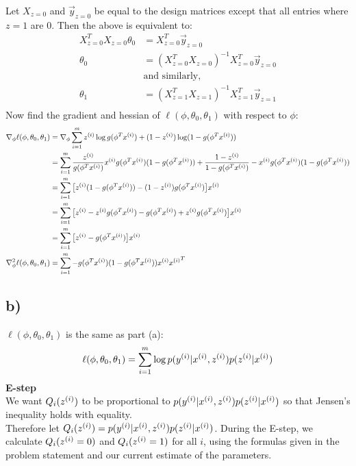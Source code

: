 \documentclass[11pt]{article}
\begin{document}
Let $X_{z = 0}$ and $\vec{y}_{z=0}$ be equal to the design matrices except that all entries where $z = 1$ are $0$. Then the above is equivalent to:
\begin{align*}
    X_{z=0}^T X_{z=0} \theta_0 &= X_{z=0}^T \vec{y}_{z=0} \\
                      \theta_0 &= (X_{z=0}^T X_{z=0})^{-1} X_{z=0}^T \vec{y}_{z=0} \\
                      &\text{and similarly,} \\
                      \theta_1 &= (X_{z=1}^T X_{z=1})^{-1} X_{z=1}^T \vec{y}_{z=1} \\
\end{align*}
Now find the gradient and hessian of $\ell(\phi,\theta_0,\theta_1)$ with respect to $\phi$:
\begin{align*}
    \nabla_\phi \ell(\phi,\theta_0,\theta_1) &= \nabla_\phi \sum_{i=1}^m z^{(i)} \log g(\phi^T x^{(i)}) + (1 - z^{(i)}) \log (1 - g(\phi^T x^{(i)})) \\
                                             &= \sum_{i=1}^m \frac{z^{(i)}}{g(\phi^T x^{(i)})} x^{(i)} g(\phi^T x^{(i)}) (1 - g(\phi^T x^{(i)})) + \frac{1 - z^{(i)}}{1 - g(\phi^T x^{(i)})} -x^{(i)} g(\phi^T x^{(i)})(1 - g(\phi^T x^{(i)})) \\
                                             &= \sum_{i=1}^m \big[ z^{(i)} (1 - g(\phi^T x^{(i)})) - (1 - z^{(i)}) g(\phi^T x^{(i)}) \big] x^{(i)} \\
                                             &= \sum_{i=1}^m \big[ z^{(i)} - z^{(i)} g(\phi^T x^{(i)}) - g(\phi^T x^{(i)}) + z^{(i)} g(\phi^T x^{(i)}) \big] x^{(i)} \\
                                             &= \sum_{i=1}^m \big[ z^{(i)} - g(\phi^T x^{(i)}) \big] x^{(i)} \\
  \nabla_\phi^2 \ell(\phi,\theta_0,\theta_1) &= \sum_{i=1}^m - g(\phi^T x^{(i)})(1 - g(\phi^T x^{(i)})) x^{(i)} {x^{(i)}}^T \\
\end{align*}

\subsection*{b)}
$\ell(\phi,\theta_0,\theta_1)$ is the same as part (a):
\begin{align*}
    \ell(\phi,\theta_0,\theta_1) = \sum_{i=1}^m \log p(y^{(i)}|x^{(i)},z^{(i)}) p(z^{(i)}|x^{(i)}) \\
\end{align*}
\textbf{E-step}\\
We want $Q_i(z^{(i)})$ to be proportional to $p(y^{(i)}|x^{(i)},z^{(i)}) p(z^{(i)}|x^{(i)})$ so that Jensen's inequality holds with equality. \\
Therefore let $Q_i(z^{(i)}) = p(y^{(i)}|x^{(i)},z^{(i)}) p(z^{(i)}|x^{(i)})$. During the E-step, we calculate $Q_i(z^{(i)} = 0)$ and $Q_i(z^{(i)} = 1)$ for all $i$, using the formulas given in the problem statement and our current estimate of the parameters.\\
\end{document}
